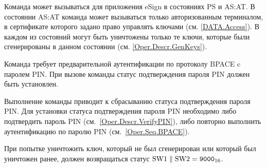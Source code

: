 Команда может вызываться для приложения eSign в состояниях PS и AS:AT.
В состоянии AS:AT команда может вызываться только
авторизованным терминалом, в сертификате которого задано право
управлять ключами (см. \ref{DATA.Access}).
В каждом из состояний могут быть уничтожены только те ключи, которые
были сгенерированы в данном состоянии (см. \ref{Oper.Descr.GenKeys}).

Команда требует предварительной аутентификации по протоколу BPACE
c паролем PIN. При вызове команды статус подтверждения пароля PIN 
должен быть установлен.

Выполнение команды приводит к сбрасыванию статуса подтверждения пароля PIN.
Для установки статуса подтверждения пароля PIN 
необходимо либо подтвердить пароль PIN (см.~\ref{Oper.Descr.VerifyPIN}), 
либо повторно выполнить аутентификацию по паролю PIN (см.~\ref{Oper.Seq.BPACE}).

При попытке уничтожить ключ, который не был сгенерирован
или который был уничтожен ранее, должен возвращаться 
статус $\text{SW1} \parallel \text{SW2} = \texttt{9000}_{16}$.